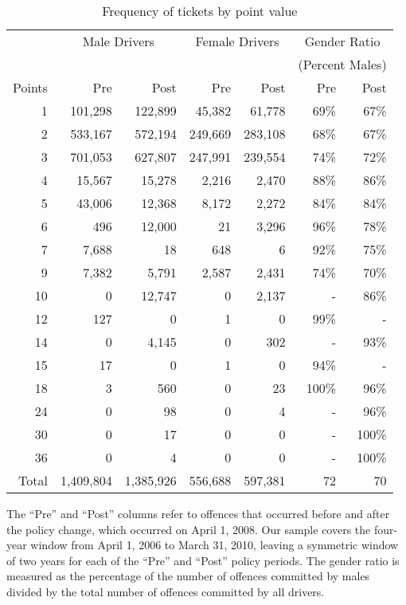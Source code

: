 
\begin{table}%
\centering
\begin{tabular}{r r r r r r r}
  \hline
		& \multicolumn{2}{c}{Male Drivers} 	&  \multicolumn{2}{c}{Female Drivers} &  \multicolumn{2}{c}{Gender Ratio} \\
 & & & & & \multicolumn{2}{c}{(Percent Males)} \\

 \cmidrule(lr){2-3}\cmidrule(lr){4-5}\cmidrule(lr){6-7} 
Points 	& Pre 		& Post		& Pre 		& Post		& Pre 		& Post		\\ 
  \hline
1 		& 101,298 	& 122,899	&  45,382 	&   61,778 	& 69\% 	& 67\% \\ 
2 		& 533,167 	& 572,194	& 249,669 	& 283,108 	& 68\% 	& 67\% \\ 
3 		& 701,053 	& 627,807	& 247,991	& 239,554	& 74\% 	& 72\% \\ 
4 		&  15,567 	&  15,278 	&    2,216 	&    2,470 	& 88\% 	& 86\% \\ 
5 		&  43,006 	&  12,368 	&    8,172 	&    2,272 	& 84\% 	& 84\% \\ 
6 		&     496 	&  12,000 	&        21 	&    3,296 	& 96\% 	& 78\% \\ 
7 		&   7,688 	&        18 	&      648 	&          6 	& 92\% 	& 75\% \\ 
9 		&   7,382 	&    5,791 	&    2,587 	&    2,431 	& 74\% 	& 70\% \\ 
10 		&         0 	&  12,747 	&         0 	&    2,137 	& -			& 86\% \\ 
12 		&     127	&         0 	&         1 	&         0 	& 99\% 	& - \\ 
14 		&       0 	&   4,145 	&         0 	&      302 	& -			& 93\% \\ 
15 		&      17 	&         0 	&         1 	&         0 	& 94\% 	& - \\ 
18 		&       3 	&      560 	&         0 	&        23 	& 100\% 	& 96\% \\ 
24 		&       0 	&       98 	&         0 	&         4 	& -			& 96\% \\ 
30 		&       0 	&       17 	&         0 	&         0 	& -			& 100\% \\ 
36 		&       0 	&        4 	&         0 	&         0 	& -			& 100\% \\ 

   \hline

Total 	  & 1,409,804 & 1,385,926 & 556,688 & 597,381 & 72 & 70 \\ 

   \hline
\end{tabular}
\caption{Frequency of tickets by point value} 
The ``Pre'' and ``Post'' columns refer to offences that occurred before and after the policy change, which occurred on April 1, 2008. 
Our sample covers the four-year window from April 1, 2006 to March 31, 2010, 
leaving a symmetric window of two years for each of the ``Pre'' and ``Post'' policy periods.
The gender ratio is measured as the percentage of the number of offences committed by males 
divided by the total number of offences committed by all drivers. 
\label{tab:point_freq}
\end{table}